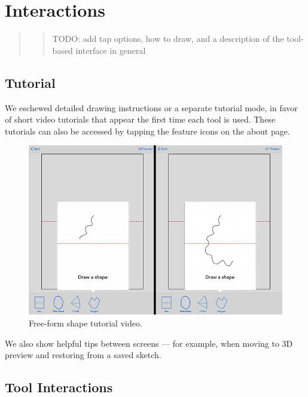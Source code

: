 \section{Interactions}\label{interactions}

\begin{quote}
\begin{quote}
TODO: add tap options, how to draw, and a description of the tool-based
interface in general
\end{quote}
\end{quote}

\subsection{Tutorial}\label{tutorial}

We eschewed detailed drawing instructions or a separate tutorial mode,
in favor of short video tutorials that appear the first time each tool
is used. These tutorials can also be accessed by tapping the feature
icons on the about page.

\begin{figure}[htbp]
\centering
\includegraphics{figures/32_UI_Tool_Interactions/tutorial_step_one_two.png}
\caption{Free-form shape tutorial video.}
\end{figure}

We also show helpful tips between screens --- for example, when moving
to 3D preview and restoring from a saved sketch.

\subsection{Tool Interactions}\label{tool-interactions}

